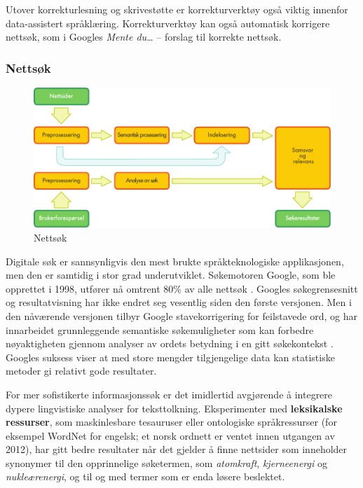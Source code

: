 \begin{multicols}{2}
Utover korrekturlesning og skrivestøtte er korrekturverktøy også viktig innenfor data-assistert språklæring. Korrekturverktøy kan også automatisk korrigere nettsøk, som i Googles \textit{Mente du…}  -- forslag til korrekte nettsøk.

\subsubsection{Nettsøk}

\begin{figure}[htb]
  \center
  \includegraphics[width=\textwidth]{../_media/norwegian-bokmaal/web_search_architecture}
  \caption{Nettsøk}
  \label{fig:websearcharch_no}
 \end{figure}

Digitale søk er sannsynligvis den mest brukte språkteknologiske applikasjonen, men den er samtidig i stor grad underutviklet. Søkemotoren Google, som ble opprettet i 1998, utfører nå omtrent 80\% av alle nettsøk \cite{spi1}. 
Googles søkegrensesnitt og resultatvisning har ikke endret seg vesentlig siden den første versjonen. Men i den nåværende versjonen tilbyr Google stavekorrigering for feilstavede ord, og har innarbeidet grunnleggende semantiske søkemuligheter som kan forbedre nøyaktigheten gjennom analyser av ordets betydning i en gitt søkekontekst \cite{pc1}. Googles suksess viser at med store mengder tilgjengelige data kan statistiske metoder gi relativt gode resultater.

For mer sofistikerte informasjonssøk er det imidlertid avgjørende å integrere dypere lingvistiske analyser for teksttolkning. Eksperimenter med \textbf{leksikalske ressurser}, som maskinlesbare tesauruser eller ontologiske språkressurser (for eksempel WordNet for engelsk; et norsk ordnett er ventet innen utgangen av 2012), har gitt bedre resultater når det gjelder å finne nettsider som inneholder synonymer til den opprinnelige søketermen, som 
\textit{atomkraft}, \textit{kjerneenergi} og \textit{nukleærenergi}, og til og med termer som er enda løsere beslektet.  


\end{multicols}
